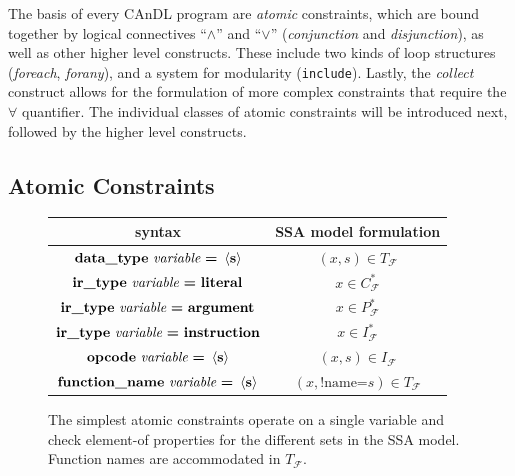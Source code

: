     \noindent
    The basis of every CAnDL program are {\it atomic} constraints, which are
    bound together by logical connectives ``$\land$'' and ``$\lor$''
    ({\it conjunction} and {\it disjunction}), as well as other higher level
    constructs.
    These include two kinds of loop structures ({\it foreach}, {\it forany}),
    and a system for modularity (\texttt{include}).
    Lastly, the {\it collect} construct allows for the formulation of more
    complex constraints that require the $\forall$ quantifier.
    The individual classes of atomic constraints will be introduced next,
    followed by the higher level constructs.

\subsection{Atomic Constraints}


\begin{figure}[t]
  \centering
  \begin{tabular}{|c|c|}
    \hline
    syntax & SSA model formulation \\
    \hline
    \hline
    $\text{\bf data\_type}\ \text{\it variable}\ \text{\bf =}\ \left<\text{\bf s}\right>$ &  $(x,s)\in T_\mathcal F$\\
    \hline
    $\text{\bf ir\_type}\ \text{\it variable}\ \text{\bf =}\ \text{\bf literal}$ &  $x\in C_\mathcal F^*$\\
    $\text{\bf ir\_type}\ \text{\it variable}\ \text{\bf =}\ \text{\bf argument}$ & $x\in P_\mathcal F^*$\\
    $\text{\bf ir\_type}\ \text{\it variable}\ \text{\bf =}\ \text{\bf instruction}$ & $x\in I_\mathcal F^*$\\
    \hline
    $\text{\bf opcode}\ \text{\it variable}\ \text{\bf =}\ \left<\text{\bf s}\right>$ & $(x,s)\in I_\mathcal F$\\
    \hline
    $\text{\bf function\_name}\ \text{\it variable}\ \text{\bf =}\ \left<\text{\bf s}\right>$ & $(x,\text{!name=}s)\in T_\mathcal F$\\
    \hline
  \end{tabular}
  \caption{The simplest atomic constraints operate on a single variable and
           check element-of properties for the different sets in the SSA model.
           Function names are accommodated in $T_\mathcal F$.}
  \label{onevaratomics}
\end{figure}

